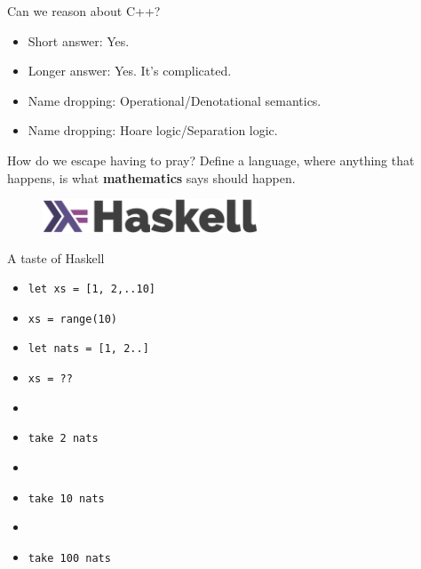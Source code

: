 \documentclass[8pt]{beamer}
\newcommand{\py}[1]{\texttt{#1}}
\newcommand{\hs}[1]{\texttt{#1}}
\begin{document}
\begin{frame}[fragile]{Can we reason about C++?}
    \pause
    \begin{itemize}
    \item Short answer: Yes. \pause
    \item Longer answer: Yes. It's complicated. \pause
    \item Name dropping: Operational/Denotational semantics. \pause
    \item Name dropping: Hoare logic/Separation logic. \pause
    \end{itemize}
\end{frame}


\begin{frame}[fragile]{How do we escape having to pray?}
    \pause
    Define a language, \pause where anything that happens, \pause is what \textbf{mathematics} says should happen.
    \pause

\begin{figure}
\includegraphics[height=1cm]{./haskell-logo.png}
\end{figure}
\end{frame}

\begin{frame}[fragile]{A taste of Haskell}
    \begin{itemize}
        \item \hs{let xs = [1, 2,..10]} \pause
        \item \py{xs = range(10)} \pause
        \item \hs{let nats = [1, 2..]} \pause
        \item \py{xs = ??} \pause
        \item \item \hs{take 2 nats} \pause
        \item \item \hs{take 10 nats} \pause
        \item \item \hs{take 100 nats} \pause
    \end{itemize}
\end{frame}
\end{document}
